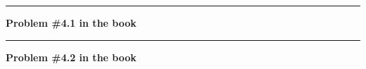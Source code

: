 \documentclass[11pt]{article}
\begin{document}



\vskip 1cm
\hrule
{\bf Problem \#4.1 in the book}





\vskip 1cm
\hrule
{\bf Problem \#4.2 in the book}



\end{document}
